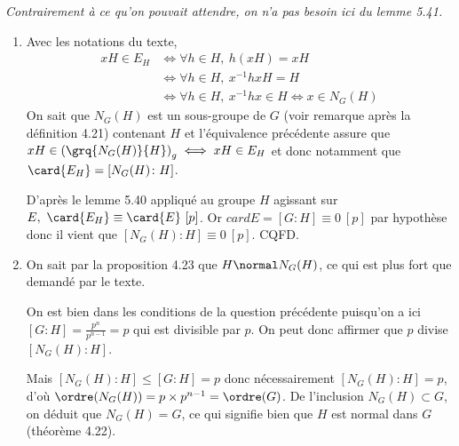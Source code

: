 
\emph{Contrairement à ce qu'on pouvait attendre, on n'a pas besoin ici du lemme 5.41.}
\begin{enumerate}
\item Avec les notations du texte,
\begin{align*}
 xH \in E_H & \iff \forall h\in H,~ h (xH) = xH\\
 & \iff \forall h\in H,~ x^{-1}hx H = H \\
 & \iff \forall h\in H,~ x^{-1}hx \in H \iff x \in N_G(H)
\end{align*}
On sait que $N_G(H)$ est un sous-groupe de $G$ (voir remarque après la définition 4.21) contenant $H$ et l'équivalence précédente assure que $xH \in \left(\grq{N_G(H)}{H}\right)_g \iff xH \in E_H$ et donc notamment que $\card{E_H} = [N_G(H) \colon H]$.

D'après le lemme 5.40 appliqué au groupe $H$ agissant sur $E,~ \card{E_H} \equiv \card{E}~ [p]$. Or $card{E} = [G\colon H] \equiv 0~ [p]$ par hypothèse donc il vient que $[N_G(H) \colon H]\equiv 0~ [p]$. CQFD.

\item On sait par la proposition 4.23 que $H\normal N_G(H)$, ce qui est plus fort que demandé par le texte.

On est bien dans les conditions de la question précédente puisqu'on a ici $[G\colon H] = \frac{p^n}{p^{n-1}} = p$ qui est divisible par $p$. On peut donc affirmer que $p$ divise $[N_G(H) \colon H]$.

Mais $[N_G(H) \colon H] \leqslant [G\colon H] = p$ donc nécessairement $[N_G(H) \colon H] = p$, d'où $\ordre(N_G(H)) = p\times p^{n-1} = \ordre(G)$. De l'inclusion $N_G(H) \subset G$, on déduit que $N_G(H) = G$, ce qui signifie bien que $H$ est normal dans $G$ (théorème 4.22).

\end{enumerate}

